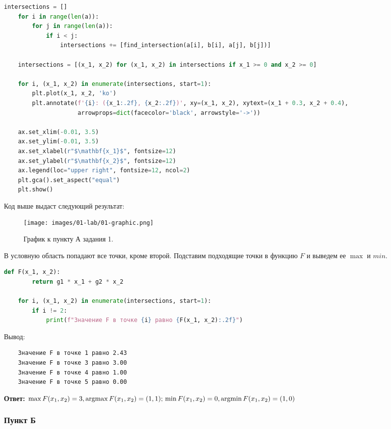 \begin{lstlisting}[language=Python, label=code: 01-lab-01-code]
    intersections = []
    for i in range(len(a)):
        for j in range(len(a)):
            if i < j:
                intersections += [find_intersection(a[i], b[i], a[j], b[j])]
    
    intersections = [(x_1, x_2) for (x_1, x_2) in intersections if x_1 >= 0 and x_2 >= 0]
    
    for i, (x_1, x_2) in enumerate(intersections, start=1):
        plt.plot(x_1, x_2, 'ko')
        plt.annotate(f'{i}: ({x_1:.2f}, {x_2:.2f})', xy=(x_1, x_2), xytext=(x_1 + 0.3, x_2 + 0.4),
                     arrowprops=dict(facecolor='black', arrowstyle='->'))
    
    ax.set_xlim(-0.01, 3.5)
    ax.set_ylim(-0.01, 3.5)
    ax.set_xlabel(r"$\mathbf{x_1}$", fontsize=12)
    ax.set_ylabel(r"$\mathbf{x_2}$", fontsize=12)
    ax.legend(loc="upper right", fontsize=12, ncol=2)
    plt.gca().set_aspect("equal")
    plt.show()

\end{lstlisting}

Код выше выдаст следующий результат:
\begin{figure}[H]
    \texttt{[image: images/01-lab/01-graphic.png]}
    \caption{График к пункту А задания 1.}
    \label{fig:01-lab-01-graphic}
\end{figure}

В условную область попадают все точки, кроме второй. Подставим подходящие точки в функцию $F$ и выведем ее $\max$ и $min$.

\begin{lstlisting}[language=Python]
    def F(x_1, x_2):
        return g1 * x_1 + g2 * x_2

    for i, (x_1, x_2) in enumerate(intersections, start=1):
        if i != 2:
            print(f"Значение F в точке {i} равно {F(x_1, x_2):.2f}")
\end{lstlisting}

Вывод:
\begin{verbatim}
    Значение F в точке 1 равно 2.43
    Значение F в точке 3 равно 3.00
    Значение F в точке 4 равно 1.00
    Значение F в точке 5 равно 0.00
\end{verbatim}

\textbf{Ответ:} $\max F(x_1, x_2) = 3, \operatorname*{argmax} F(x_1, x_2) = (1, 1);\\
\min F(x_1, x_2) = 0, \operatorname*{argmin} F(x_1, x_2) = (1, 0)$

\subsubsection{Пункт Б}

